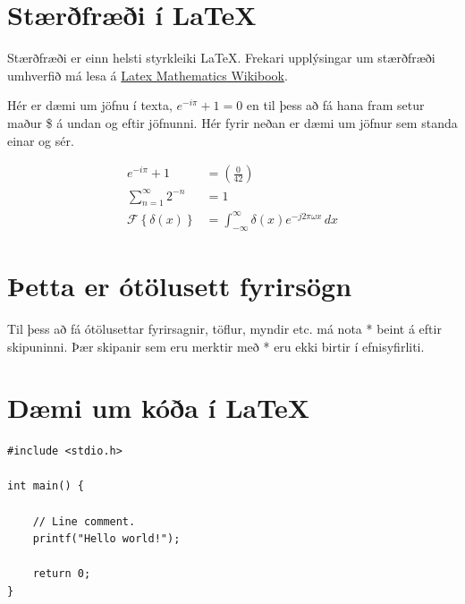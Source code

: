 \documentclass[a4paper]{article}
\begin{document}
\section{Stærðfræði í \LaTeX}
Stærðfræði er einn helsti styrkleiki \LaTeX. Frekari upplýsingar um stærðfræði umhverfið má lesa á \href{http://en.wikibooks.org/wiki/LaTeX/Mathematics}{Latex Mathematics Wikibook}.

Hér er dæmi um jöfnu í texta, $e^{-i\pi} + 1 = 0$ en til þess að fá hana fram setur maður \$ á undan og eftir jöfnunni. Hér fyrir neðan er dæmi um jöfnur sem standa einar og sér.


\begin{align}
	e^{-i\pi} + 1 &= \left(\frac{0}{42}\right) \\ %
    \sum_{n=1}^{\infty} 2^{-n} &= 1 \\
    \mathcal{F}\left\{ \delta(x) \right\} &= \int_{-\infty}^{\infty} \delta(x) e^{-j 2 \pi \omega x}\,dx\nonumber %
\end{align}

\pagebreak %

\section*{Þetta er ótölusett fyrirsögn}
Til þess að fá ótölusettar fyrirsagnir, töflur, myndir etc. má nota * beint á eftir skipuninni. Þær skipanir sem eru merktir með * eru ekki birtir í efnisyfirliti.


\section{Dæmi um kóða í \LaTeX}

\begin{lstlisting}
#include <stdio.h>
 
int main() {
 
    // Line comment.
    printf("Hello world!");
 
    return 0;
}
\end{lstlisting}
\end{document}
